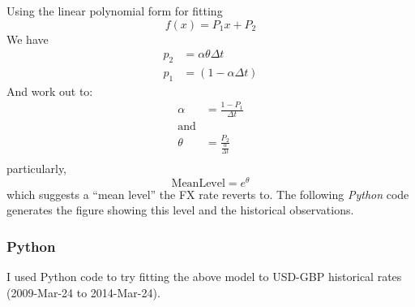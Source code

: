 \documentclass{article}
\begin{document}
    Using the linear polynomial form for fitting \[f(x)=P_1 x + P_2\] We
have \[
\begin{equation}
\begin{split}
p_2&=\alpha \theta \Delta t \\
p_1&=(1-\alpha\Delta t)
\end{split}
\end{equation}
\] And work out to: \[
\begin{equation}
\begin{split}
\alpha &=\frac{1-P_1}{\Delta t}\\
\mathrm{and} \\
\theta &= \frac{P_2}{\frac{\alpha}{\Delta t}}\\
\end{split}
\end{equation}
\] particularly, \[\mathrm{MeanLevel}=e^{\theta}\] which suggests a
``mean level'' the FX rate reverts to. The following \emph{Python} code
generates the figure showing this level and the historical observations.


    \subsubsection{Python}


    I used Python code to try fitting the above model to USD-GBP historical
rates (2009-Mar-24 to 2014-Mar-24).
\end{document}
